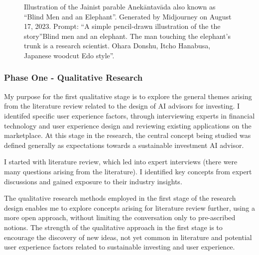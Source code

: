 \documentclass[
  12pt,
  letterpaper,
  DIV=11,
  numbers=noendperiod]{scrartcl}
\begin{document}
\begin{figure}


\caption[Illustration of the Jainist parable
Anekāntavāda]{\label{fig-co2-parable}Illustration of the Jainist parable
Anekāntavāda also known as ``Blind Men and an Elephant''. Generated by
Midjourney on August 17, 2023. Prompt: ``A simple pencil-drawn
illustration of the the story''Blind men and an elephant. The man
touching the elephant's trunk is a research scientist. Ohara Donshu,
Itcho Hanabusa, Japanese woodcut Edo style''.}

\end{figure}%

\subsubsection{Phase One - Qualitative
Research}\label{phase-one---qualitative-research}

My purpose for the first qualitative stage is to explore the general
themes arising from the literature review related to the design of AI
advisors for investing. I identifed specific user experience factors,
through interviewing experts in financial technology and user experience
design and reviewing existing applications on the marketplace. At this
stage in the research, the central concept being studied was defined
generally as expectations towards a sustainable investment AI advisor.

I started with literature review, which led into expert interviews
(there were many questions arising from the literature). I identified
key concepts from expert discussions and gained exposure to their
industry insights.

The qualitative research methods employed in the first stage of the
research design enables me to explore concepts arising for literature
review further, using a more open approach, without limiting the
conversation only to pre-ascribed notions. The strength of the
qualitative approach in the first stage is to encourage the discovery of
new ideas, not yet common in literature and potential user experience
factors related to sustainable investing and user experience.
\end{document}
